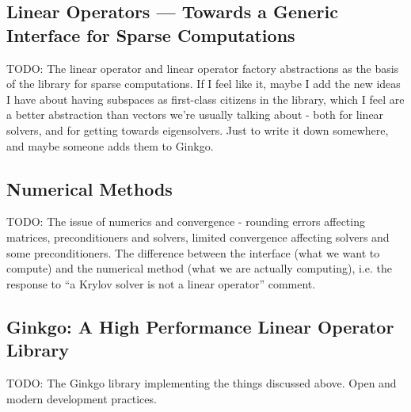 \subsection{Linear Operators --- Towards a Generic Interface for Sparse
            Computations}
TODO: The linear operator and linear operator factory abstractions as the basis
      of the library for sparse computations.
      If I feel like it, maybe I add the new ideas I have about having subspaces
      as first-class citizens in the library, which I feel are a better
      abstraction than vectors we're usually talking about - both for linear
      solvers, and for getting towards eigensolvers. Just to write it down
      somewhere, and maybe someone adds them to Ginkgo.
\subsection{Numerical Methods}
TODO: The issue of numerics and convergence - rounding errors affecting
matrices, preconditioners and solvers, limited convergence affecting solvers and
some preconditioners. The difference between the interface (what we want to
compute) and the numerical method (what we are actually computing), i.e. the
response to ``a Krylov solver is not a linear operator'' comment.

\subsection{Ginkgo: A High Performance Linear Operator Library}
TODO: The Ginkgo library implementing the things discussed above. Open and
modern development practices.


